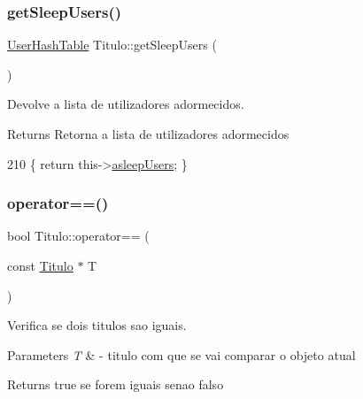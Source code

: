 \subsubsection{\texorpdfstring{get\+Sleep\+Users()}{getSleepUsers()}}
{\footnotesize\ttfamily \hyperlink{Titulo_8h_a0996281e9e5d419736dec228200cfdc5}{User\+Hash\+Table} Titulo\+::get\+Sleep\+Users (\begin{DoxyParamCaption}{ }\end{DoxyParamCaption})\hspace{0.3cm}{\ttfamily [inline]}}



Devolve a lista de utilizadores adormecidos. 

\begin{DoxyReturn}{Returns}
Retorna a lista de utilizadores adormecidos 
\end{DoxyReturn}

\begin{DoxyCode}
210 \{ \textcolor{keywordflow}{return} this->\hyperlink{classTitulo_a84e7b9dc58fbba5f048a57a0878a43e8}{asleepUsers}; \}
\end{DoxyCode}
\mbox{\label{classTitulo_ac0622a3b256910ac87ee900a9be014b6}} 
\subsubsection{\texorpdfstring{operator==()}{operator==()}}
{\footnotesize\ttfamily bool Titulo\+::operator== (\begin{DoxyParamCaption}\item[{const \hyperlink{classTitulo}{Titulo} $\ast$}]{T }\end{DoxyParamCaption})}



Verifica se dois titulos sao iguais. 


\begin{DoxyParams}{Parameters}
{\em T} & -\/ titulo com que se vai comparar o objeto atual \\
\hline
\end{DoxyParams}
\begin{DoxyReturn}{Returns}
true se forem iguais senao falso 
\end{DoxyReturn}

